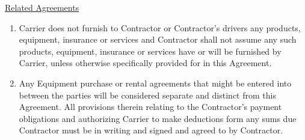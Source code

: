 \underline{Related Agreements}
\begin{enumerate}[
    ref = \SecondLevelEnumerator
]
    \item Carrier does not furnish to Contractor or Contractor's drivers
    any products, equipment, insurance or services and Contractor shall not
    assume any such products, equipment, insurance or services have or will
    be furnished by Carrier, unless otherwise specifically provided for in
    this Agreement.

    \item Any Equipment purchase or rental agreements that might be entered
    into between the parties will be considered separate and distinct from
    this Agreement. All provisions therein relating to the Contractor's
    payment obligations and authorizing Carrier to make deductions form any
    sums due Contractor must be in writing and signed and agreed to by
    Contractor.
\end{enumerate}